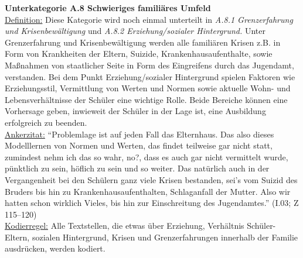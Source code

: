 \noindent
\textbf{Unterkategorie A.8 Schwieriges familiäres Umfeld}\\
\underline{Definition:} Diese Kategorie wird noch einmal unterteilt in \textit{A.8.1 Grenzerfahrung und Krisenbewältigung} und \textit{A.8.2 Erziehung/sozialer Hintergrund.} Unter Grenzerfahrung und Krisenbewältigung werden alle familiären Krisen z.B. in Form von Krankheiten der Eltern, Suizide, Krankenhausaufenthalte, sowie Maßnahmen von staatlicher Seite in Form des Eingreifens durch das Jugendamt, verstanden. Bei dem Punkt Erziehung/sozialer Hintergrund spielen Faktoren wie Erziehungsstil, Vermittlung von Werten und Normen sowie aktuelle Wohn- und Lebensverhältnisse der Schüler eine wichtige Rolle. Beide Bereiche können eine Vorhersage geben, inwieweit der Schüler in der Lage ist, eine Ausbildung erfolgreich zu beenden.\\
\underline{Ankerzitat:} "`Problemlage ist auf jeden Fall das Elternhaus. Das also dieses Modelllernen von Normen und Werten, das findet teilweise gar nicht statt, zumindest nehm ich das so wahr, no?, dass es auch gar nicht vermittelt wurde, pünktlich zu sein, höflich zu sein und so weiter. Das natürlich auch in der Vergangenheit bei den Schülern ganz viele Krisen bestanden, sei's vom Suizid des Bruders bis hin zu Krankenhausaufenthalten, Schlaganfall der Mutter. Also wir hatten schon wirklich Vieles, bis hin zur Einschreitung des Jugendamtes."' (I.03; Z 115--120)\\
\underline{Kodierregel:} Alle Textstellen, die etwas über Erziehung, Verhältnis Schüler-Eltern, sozialen Hintergrund, Krisen und Grenzerfahrungen innerhalb der Familie ausdrücken, werden kodiert.\\


